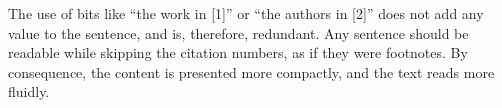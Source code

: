 


\noindent
The use of bits like ``the work in [1]'' or ``the authors in [2]'' does not add any value to the sentence, and is, therefore, redundant.
Any sentence should be readable while skipping the citation numbers, as if they were footnotes.
By consequence, the content is presented more compactly, and the text reads more fluidly.
